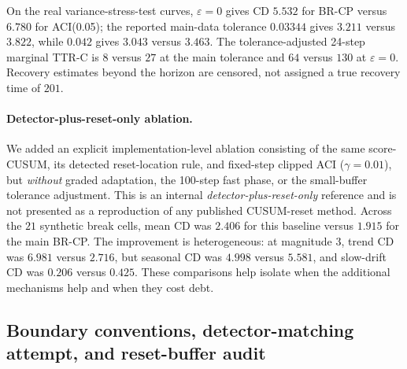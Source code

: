 \documentclass[10pt]{article}
\begin{document}
On the real variance-stress-test curves, $\varepsilon=0$ gives CD $5.532$
for BR-CP versus $6.780$ for ACI(0.05); the reported main-data tolerance
$0.03344$ gives $3.211$ versus $3.822$, while $0.042$ gives $3.043$ versus
$3.463$. The tolerance-adjusted 24-step marginal TTR-C is $8$ versus $27$
at the main tolerance and $64$ versus $130$ at $\varepsilon=0$.
Recovery estimates beyond the horizon are censored, not assigned a true
recovery time of $201$.

\paragraph{Detector-plus-reset-only ablation.}
We added an explicit implementation-level ablation consisting of the same
score-CUSUM, its detected reset-location rule, and fixed-step clipped ACI
($\gamma=0.01$), but \emph{without} graded adaptation, the 100-step fast
phase, or the small-buffer tolerance adjustment. This is an internal
\emph{detector-plus-reset-only} reference and is not presented as a
reproduction of any published CUSUM-reset method. Across the $21$ synthetic
break cells, mean CD was $2.406$ for this baseline versus $1.915$ for the
main BR-CP. The improvement is heterogeneous: at magnitude 3, trend CD
was $6.981$ versus $2.716$, but seasonal CD was $4.998$ versus $5.581$,
and slow-drift CD was $0.206$ versus $0.425$. These comparisons help
isolate when the additional mechanisms help and when they cost debt.


\subsection{Boundary conventions, detector-matching attempt, and reset-buffer audit}
\label{sec:checks}
\end{document}
